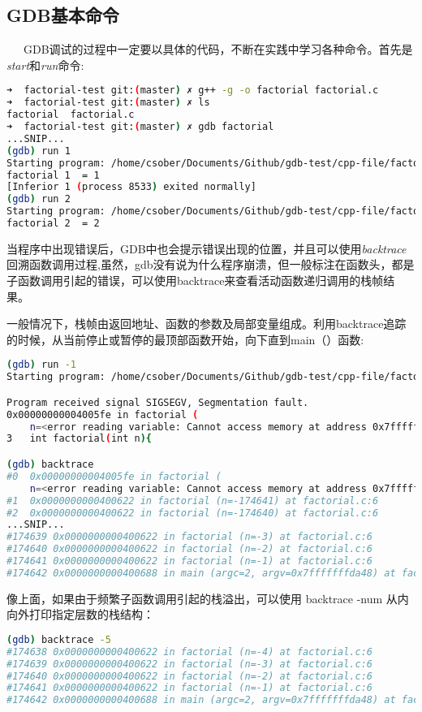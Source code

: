 \documentclass[12pt]{article}  %
\begin{document}
\subsection{GDB基本命令}
\ \ \ GDB调试的过程中一定要以具体的代码，不断在实践中学习各种命令。首先是\emph{start}和\emph{run}命令:
\begin{lstlisting}[language=sh]
➜  factorial-test git:(master) ✗ g++ -g -o factorial factorial.c 
➜  factorial-test git:(master) ✗ ls
factorial  factorial.c
➜  factorial-test git:(master) ✗ gdb factorial 
...SNIP...
(gdb) run 1
Starting program: /home/csober/Documents/Github/gdb-test/cpp-file/factorial-test/factorial 1
factorial 1  = 1
[Inferior 1 (process 8533) exited normally]
(gdb) run 2
Starting program: /home/csober/Documents/Github/gdb-test/cpp-file/factorial-test/factorial 2
factorial 2  = 2
\end{lstlisting}\par
当程序中出现错误后，GDB中也会提示错误出现的位置，并且可以使用\emph{backtrace}回溯函数调用过程,虽然，gdb没有说为什么程序崩溃，但一般标注在函数头，都是子函数调用引起的错误，可以使用backtrace来查看活动函数递归调用的栈帧结果。\par
一般情况下，栈帧由返回地址、函数的参数及局部变量组成。利用backtrace追踪的时候，从当前停止或暂停的最顶部函数开始，向下直到main（）函数:
\begin{lstlisting}[language=sh]
(gdb) run -1
Starting program: /home/csober/Documents/Github/gdb-test/cpp-file/factorial-test/factorial -1

Program received signal SIGSEGV, Segmentation fault.
0x00000000004005fe in factorial (
    n=<error reading variable: Cannot access memory at address 0x7fffff7fefec>) at factorial.c:3
3	int factorial(int n){

(gdb) backtrace
#0  0x00000000004005fe in factorial (
    n=<error reading variable: Cannot access memory at address 0x7fffff7fefec>) at factorial.c:3
#1  0x0000000000400622 in factorial (n=-174641) at factorial.c:6
#2  0x0000000000400622 in factorial (n=-174640) at factorial.c:6
...SNIP...
#174639 0x0000000000400622 in factorial (n=-3) at factorial.c:6
#174640 0x0000000000400622 in factorial (n=-2) at factorial.c:6
#174641 0x0000000000400622 in factorial (n=-1) at factorial.c:6
#174642 0x0000000000400688 in main (argc=2, argv=0x7fffffffda48) at factorial.c:16
\end{lstlisting}\par
像上面，如果由于频繁子函数调用引起的栈溢出，可以使用 backtrace -num 从内向外打印指定层数的栈结构：
\begin{lstlisting}[language=sh]
(gdb) backtrace -5
#174638 0x0000000000400622 in factorial (n=-4) at factorial.c:6
#174639 0x0000000000400622 in factorial (n=-3) at factorial.c:6
#174640 0x0000000000400622 in factorial (n=-2) at factorial.c:6
#174641 0x0000000000400622 in factorial (n=-1) at factorial.c:6
#174642 0x0000000000400688 in main (argc=2, argv=0x7fffffffda48) at factorial.c:16
\end{lstlisting}\par
\end{document}
